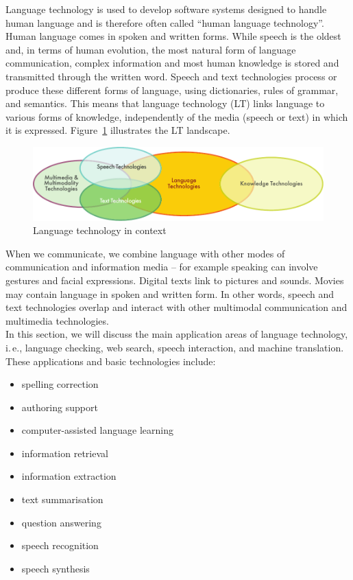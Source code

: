 \begin{multicols}{2}

Language technology is used to develop software systems designed to handle human language and is therefore often called “human language technology”. Human language comes in spoken and written forms. While speech is the oldest and, in terms of human evolution, the most natural form of language communication, complex information and most human knowledge is stored and transmitted through the written word. Speech and text technologies process or produce these different forms of language, using dictionaries, rules of grammar, and semantics. This means that language technology (LT) links language to various forms of knowledge, independently of the media (speech or text) in which it is expressed. Figure~\ref{fig:ltincontext_en} illustrates the LT landscape.

\begin{figure}[htb]
  \center
  \includegraphics[width=\textwidth]{../_media/english/language_technologies}
  \caption{Language technology in context}
\label{fig:ltincontext_en}
\end{figure}

When we communicate, we combine language with other modes of communication and information media – for example speaking can involve gestures and facial expressions. Digital texts link to pictures and sounds. Movies may contain language in spoken and written form. In other words, speech and text technologies overlap and interact with other multimodal communication and multimedia technologies.\\ 
In this section, we will discuss the main application areas of language technology, i.\,e., language checking, web search, speech interaction, and machine translation. These applications and basic technologies include:

\begin{itemize}
\item spelling correction
\item authoring support
\item computer-assisted language learning
\item information retrieval 
\item information extraction
\item text summarisation
\item question answering
\item speech recognition 
\item speech synthesis 
\end{itemize}


\end{multicols}
